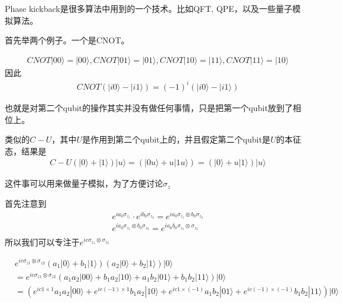 Phase kickback是很多算法中用到的一个技术。比如QFT, QPE，以及一些量子模拟算法。

首先举两个例子。一个是CNOT。

\begin{equation}
\begin{split}
&CNOT|00\rangle = |00\rangle, CNOT|01\rangle = |01\rangle, CNOT|10\rangle = |11\rangle, CNOT|11\rangle = |10\rangle
\end{split}
\end{equation}
因此
\begin{equation}
\begin{split}
&CNOT\left(|i0\rangle - |i1\rangle\right)=(-1)^i \left(|i0\rangle - |i1\rangle\right)
\end{split}
\end{equation}

也就是对第二个qubit的操作其实并没有做任何事情，只是把第一个qubit放到了相位上。

类似的$C-U$，其中$U$是作用到第二个qubit上的，并且假定第二个qubit是$U$的本征态，结果是
\begin{equation}
\begin{split}
&C-U\left(|0\rangle + |1\rangle\right)|u\rangle =\left(|0u\rangle + u|1u\rangle\right)=(|0\rangle+u|1\rangle)|u\rangle
\end{split}
\end{equation}

这件事可以用来做量子模拟，为了方便讨论$\sigma _z$

首先注意到
\begin{equation}
\begin{split}
&e^{ia_0\sigma _{z_1}} \cdot e^{ib_0\sigma _{z_2}}=e^{ia_0\sigma _{z_1} \otimes b_0\sigma _{z_2}}\\
&e^{ia_0\sigma _{z_1} \otimes b_0\sigma _{z_2}} = e^{ia_0 b_0 \sigma _{z_1} \otimes \sigma _{z_2}}\\
\end{split}
\end{equation}
所以我们可以专注于$e^{ic\sigma _{z_1}\otimes \sigma _{z_2}}$


\begin{equation}
\begin{split}
&e^{ic\sigma _{z1}\otimes \sigma _{z2}}\left(a_1|0\rangle + b_1|1\rangle\right)\left(a_2|0\rangle + b_2|1\rangle\right)|0\rangle \\
&=e^{ic\sigma _{z1}\otimes \sigma _{z2}}\left(a_1 a_2|00\rangle + b_1 a_2|10\rangle + a_1b_2|01\rangle + b_1b_2|11\rangle\right)|0\rangle \\
&=\left(e^{ic 1 \times 1}a_1 a_2 |00\rangle + e^{ic (-1)\times 1}b_1 a_2|10\rangle + e^{ic 1 \times (-1)}a_1b_2|01\rangle + e^{ic (-1)\times (-1)}b_1b_2|11\rangle\right)|0\rangle \\
\end{split}
\end{equation}

